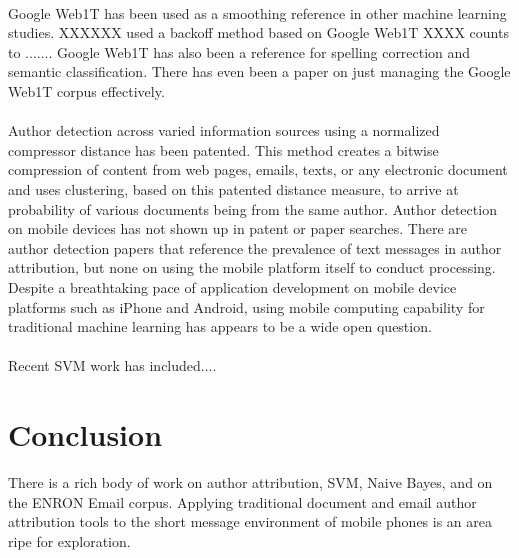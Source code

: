 	\paragraph{} Google Web1T has been used as a smoothing reference in other machine learning studies.  XXXXXX used a backoff method based on Google Web1T XXXX counts to ....... Google Web1T has also been a reference for spelling correction\cite{} and semantic classification\cite{}.  There has even been a paper on just managing the Google Web1T corpus effectively\cite{}.
	\paragraph{} Author detection across varied information sources using a normalized compressor distance has been patented.  This method creates a bitwise compression of content from web pages, emails, texts, or any electronic document and uses clustering, based on this patented distance measure, to arrive at probability of various  documents being from the same author.\cite{_method_????}  Author detection on mobile devices has not shown up in patent or paper searches.  There are author detection papers that reference the prevalence of text messages in author attribution, but none on using the mobile platform itself to conduct processing.  Despite a breathtaking pace of application development on mobile device platforms such as iPhone and Android, using mobile computing capability for traditional machine learning has appears to be a wide open question.
	\paragraph{} Recent SVM work has included....

\section{Conclusion} There is a rich body of work on author attribution, SVM, Naive Bayes, and on the ENRON Email corpus.  Applying traditional document and email author attribution tools to the short message environment of mobile phones is an area ripe for exploration.




